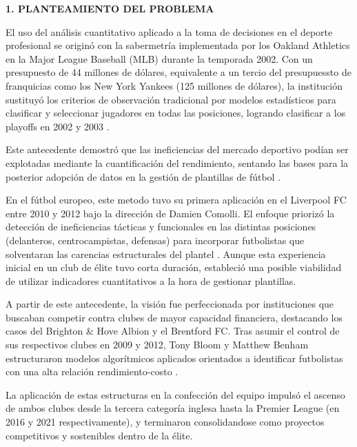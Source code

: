 \hypertarget{sec:planteamiento}{}%
\begin{center}
    {\Large\bfseries 1. PLANTEAMIENTO DEL PROBLEMA}
\end{center}
\vspace{1em}

\hypertarget{sec:antecedentes}{}%
\par\vspace{0.5em}

El uso del análisis cuantitativo aplicado a la toma de decisiones en el deporte profesional se originó con la sabermetría implementada por los Oakland Athletics en la Major League Baseball (MLB) durante la temporada 2002. Con un presupuesto de 44 millones de dólares, equivalente a un tercio del presupuessto de franquicias como los New York Yankees (125 millones de dólares), la institución sustituyó los criterios de observación tradicional por modelos estadísticos para clasificar y seleccionar jugadores en todas las posiciones, logrando clasificar a los playoffs en 2002 y 2003 \cite{lewisMoneyball}. 

Este antecedente demostró que las ineficiencias del mercado deportivo podían ser explotadas mediante la cuantificación del rendimiento, sentando las bases para la posterior adopción de datos en la gestión de plantillas de fútbol \cite{carey2024}.

En el fútbol europeo, este metodo tuvo su primera aplicación en el Liverpool FC entre 2010 y 2012 bajo la dirección de Damien Comolli. El enfoque priorizó la detección de ineficiencias tácticas y funcionales en las distintas posiciones (delanteros, centrocampistas, defensas) para incorporar futbolistas que solventaran las carencias estructurales del plantel \cite{comolliliverpool}. Aunque esta experiencia inicial en un club de élite tuvo corta duración, estableció una posible viabilidad de utilizar indicadores cuantitativos a la hora de gestionar plantillas\cite{addley2020moneyball}.

A partir de este antecedente, la visión fue perfeccionada por instituciones que buscaban competir contra clubes de mayor capacidad financiera, destacando los casos del Brighton \& Hove Albion y el Brentford FC. Tras asumir el control de sus respectivos clubes en 2009 y 2012, Tony Bloom y Matthew Benham estructuraron modelos algorítmicos aplicados orientados a identificar futbolistas con una alta relación rendimiento-costo \cite{moneyball2024}. 

La aplicación de estas estructuras en la confección del equipo impulsó el ascenso de ambos clubes desde la tercera categoría inglesa hasta la Premier League (en 2016 y 2021 respectivamente), y terminaron consolidandose como proyectos competitivos y sostenibles dentro de la élite\cite{richardson2026brentford}.

